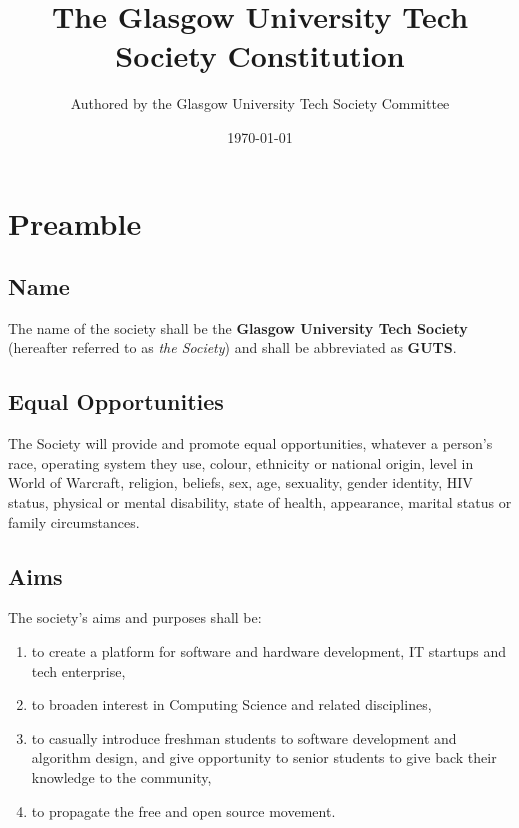\documentclass{report}
\newcommand{\society}{Glasgow University Tech Society}
\newcommand{\shortsociety}{GUTS}
\begin{document}
\title{The \society{} Constitution}
\author{Authored by the \society{} Committee}
\date{\today}
\maketitle{}

\tableofcontents
\newpage

\chapter{Preamble}

	\section{Name}

		The name of the society shall be the \textbf{\society{}} (hereafter referred to as \textit{the Society}) and shall be abbreviated as \textbf{\shortsociety{}}.

	\section{Equal Opportunities}

		The Society will provide and promote equal opportunities, whatever a person’s race, operating system they use, colour, ethnicity or national origin, level in World of Warcraft, religion, beliefs, sex, age, sexuality, gender identity, HIV status, physical or mental disability, state of health, appearance, marital status or family circumstances. 

	\section{Aims}

		The society's aims and purposes shall be:

		\begin{enumerate}
			\item{to create a platform for software and hardware development, IT startups and tech enterprise,}
			\item{to broaden interest in Computing Science and related disciplines,}
			\item{to casually introduce freshman students to software development and algorithm design, and give opportunity to senior students to give back their knowledge to the community,}
			\item{to propagate the free and open source movement.} 
		\end{enumerate}
\end{document}
